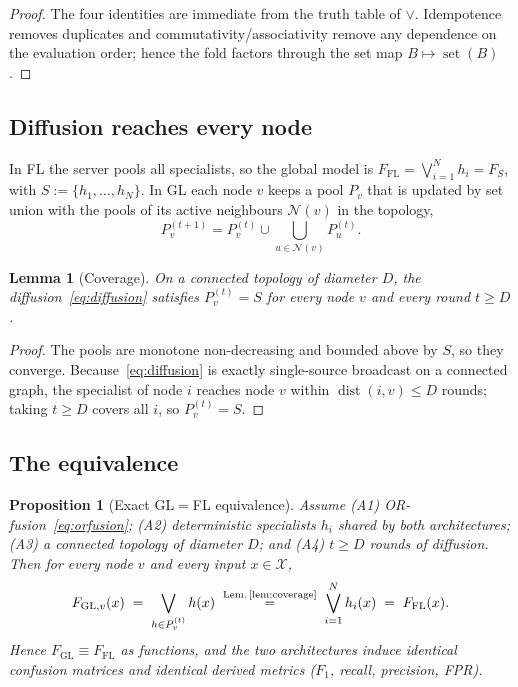 \documentclass[11pt]{article}
\newtheorem{proposition}{Proposition}
\newtheorem{lemma}{Lemma}
\theoremstyle{remark}
\newcommand{\XX}{\mathcal{X}}
\newcommand{\Fset}{F}
\begin{document}
\begin{proof}
The four identities are immediate from the truth table of $\vee$. Idempotence
removes duplicates and commutativity/associativity remove any dependence on the
evaluation order; hence the fold factors through the set map
$B\mapsto\operatorname{set}(B)$.
\end{proof}

\subsection{Diffusion reaches every node}

In FL the server pools all specialists, so the global model is
$\Fset_{\mathrm{FL}}=\bigvee_{i=1}^{N}h_i=\Fset_{S}$, with
$S:=\{h_1,\dots,h_N\}$. In GL each node $v$ keeps a pool $P_v$ that is updated by
set union with the pools of its active neighbours $\mathcal{N}(v)$ in the
topology,
\begin{equation}
  P_v^{(t+1)}=P_v^{(t)}\cup\!\!\bigcup_{u\in\mathcal{N}(v)}\!\!P_u^{(t)} .
  \label{eq:diffusion}
\end{equation}

\begin{lemma}[Coverage]
\label{lem:coverage}
On a connected topology of diameter $D$, the diffusion~\eqref{eq:diffusion}
satisfies $P_v^{(t)}=S$ for every node $v$ and every round $t\ge D$.
\end{lemma}

\begin{proof}
The pools are monotone non-decreasing and bounded above by $S$, so they
converge. Because~\eqref{eq:diffusion} is exactly single-source broadcast on a
connected graph, the specialist of node $i$ reaches node $v$ within
$\operatorname{dist}(i,v)\le D$ rounds; taking $t\ge D$ covers all $i$, so
$P_v^{(t)}=S$.
\end{proof}

\subsection{The equivalence}

\begin{proposition}[Exact GL$=$FL equivalence]
\label{prop:glfl}
Assume \textup{(A1)} OR-fusion~\eqref{eq:orfusion}; \textup{(A2)} deterministic
specialists $h_i$ shared by both architectures; \textup{(A3)} a connected
topology of diameter $D$; and \textup{(A4)} $t\ge D$ rounds of diffusion. Then
for every node $v$ and every input $x\in\XX$,
\[
  \Fset_{\mathrm{GL},v}(x)\;=\;\bigvee_{h\in P_v^{(t)}}h(x)
  \;\overset{\text{Lem.\,\ref{lem:coverage}}}{=}\;\bigvee_{i=1}^{N}h_i(x)
  \;=\;\Fset_{\mathrm{FL}}(x).
\]
Hence $\Fset_{\mathrm{GL}}\equiv\Fset_{\mathrm{FL}}$ as functions, and the two
architectures induce identical confusion matrices and identical derived metrics
($F_1$, recall, precision, FPR).
\end{proposition}
\end{document}
